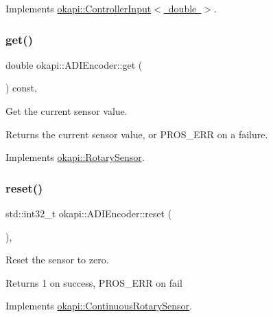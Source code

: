 Implements \mbox{\hyperlink{classokapi_1_1ControllerInput_a3c6c86d897983f367928a93890551e17}{okapi\+::\+Controller\+Input$<$ double $>$}}.

\mbox{\label{classokapi_1_1ADIEncoder_a1728a39cdb3e87e7c650961f34608f75}} 
\subsubsection{\texorpdfstring{get()}{get()}}
{\footnotesize\ttfamily double okapi\+::\+A\+D\+I\+Encoder\+::get (\begin{DoxyParamCaption}{ }\end{DoxyParamCaption}) const\hspace{0.3cm}{\ttfamily [override]}, {\ttfamily [virtual]}}

Get the current sensor value.

\begin{DoxyReturn}{Returns}
the current sensor value, or {\ttfamily P\+R\+O\+S\+\_\+\+E\+RR} on a failure. 
\end{DoxyReturn}


Implements \mbox{\hyperlink{classokapi_1_1RotarySensor_ac5534dc6c3bcbd8ea2f4e54a04cda734}{okapi\+::\+Rotary\+Sensor}}.

\mbox{\label{classokapi_1_1ADIEncoder_a8df70f75e1f23aa03eaa3e331fcab381}} 
\subsubsection{\texorpdfstring{reset()}{reset()}}
{\footnotesize\ttfamily std\+::int32\+\_\+t okapi\+::\+A\+D\+I\+Encoder\+::reset (\begin{DoxyParamCaption}{ }\end{DoxyParamCaption})\hspace{0.3cm}{\ttfamily [override]}, {\ttfamily [virtual]}}

Reset the sensor to zero.

\begin{DoxyReturn}{Returns}
1 on success, P\+R\+O\+S\+\_\+\+E\+RR on fail 
\end{DoxyReturn}


Implements \mbox{\hyperlink{classokapi_1_1ContinuousRotarySensor_ae7268b0603097ac2d93a67e4fefa43e0}{okapi\+::\+Continuous\+Rotary\+Sensor}}.




